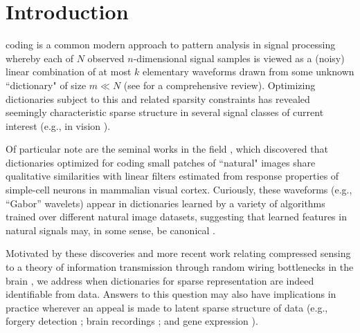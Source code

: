 \documentclass[journal, twocolumn]{IEEEtran}
\begin{document}

\section{Introduction}\label{Intro}
 coding is a common modern approach to pattern analysis in signal processing whereby each of $N$ observed $n$-dimensional signal samples is viewed as a (noisy) linear combination of at most $k$ elementary waveforms drawn from some unknown ``dictionary" of size $m \ll N$ (see \cite{Zhang15} for a comprehensive review). 
Optimizing dictionaries subject to this and related sparsity constraints has revealed seemingly characteristic sparse structure in several signal classes of current interest (e.g., in vision \cite{wang2015sparse}). 

Of particular note are the seminal works in the field \cite{Olshausen96, hurri1996image, bell1997independent, van1998independent}, which discovered that dictionaries optimized for coding small patches of ``natural" images share qualitative similarities with linear filters estimated from response properties of simple-cell neurons in mammalian visual cortex. Curiously, these waveforms (e.g., ``Gabor'' wavelets) appear in dictionaries learned by a variety of algorithms trained over different natural image datasets, suggesting that learned features in natural signals may, in some sense, be canonical \cite{donoho2001can}.

Motivated by these discoveries and more recent work relating compressed sensing \cite{eldar2012compressed} to a theory of information transmission through random wiring bottlenecks in the brain \cite{Isely10}, we address when dictionaries for sparse representation are indeed identifiable from data. Answers to this question may also have implications in practice wherever an appeal is made to latent sparse structure of data (e.g., forgery detection \cite{hughes2010, olshausen2010applied}; brain recordings \cite{jung2001imaging, agarwal2014spatially, lee2016sparse}; and gene expression \cite{wu2016stability}). 
\end{document}
